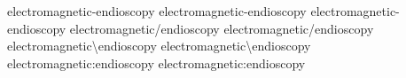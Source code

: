 \documentclass{article}
\begin{document}
electromagnetic-endioscopy
electromagnetic-endioscopy
electromagnetic\hyp{}endioscopy
electromagnetic/endioscopy
electromagnetic\fshyp{}endioscopy
electromagnetic\textbackslash endioscopy
electromagnetic\bshyp{}endioscopy
electromagnetic:endioscopy
electromagnetic\colonhyp{}endioscopy
\end{document}
